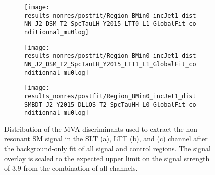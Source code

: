 \begin{figure}[htbp]
  \centering

  \begin{subfigure}{0.495\textwidth}
    \centering

    \texttt{[image: results\_nonres/postfit/Region\_BMin0\_incJet1\_distNN\_J2\_DSM\_T2\_SpcTauLH\_Y2015\_LTT0\_L1\_GlobalFit\_conditionnal\_mu0log]}

  \end{subfigure}\hfill%
  \begin{subfigure}{0.495\textwidth}
    \centering

    \texttt{[image: results\_nonres/postfit/Region\_BMin0\_incJet1\_distNN\_J2\_DSM\_T2\_SpcTauLH\_Y2015\_LTT1\_L1\_GlobalFit\_conditionnal\_mu0log]}

  \end{subfigure}

  \vspace{0.5em}

  \begin{subfigure}{0.495\textwidth}
    \centering

    \texttt{[image: results\_nonres/postfit/Region\_BMin0\_incJet1\_distSMBDT\_J2\_Y2015\_DLLOS\_T2\_SpcTauHH\_L0\_GlobalFit\_conditionnal\_mu0log]}

  \end{subfigure}

  \caption{Distribution of the MVA discriminants used to extract the
    non-resonant SM \HH signal in the \lephad SLT (a), \lephad LTT
    (b), and \hadhad (c) channel after the background-only fit of all
    signal and control regions. The signal overlay is scaled to the
    expected upper limit on the signal strength of $3.9$ from the
    combination of all channels.}
\end{figure}




